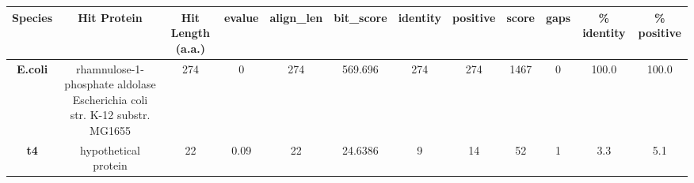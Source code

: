 \begin{tabular}{|c|c|c|c|c|c|c|c|c|c|c|c|} \hline
\textbf{Species} & \textbf{Hit Protein} & \textbf{Hit Length (a.a.)} & \textbf{evalue} & \textbf{align\_len} & \textbf{bit\_score} & \textbf{identity} & \textbf{positive} & \textbf{score} & \textbf{gaps} & \textbf{\% identity} & \textbf{\% positive} \\ \hline
\textbf{E.coli} & rhamnulose-1-phosphate aldolase Escherichia coli str. K-12 substr. MG1655 & 274 & 0 & 274 & 569.696 & 274 & 274 & 1467 & 0 & 100.0 & 100.0\\
\textbf{t4} & hypothetical protein  & 22 & 0.09 & 22 & 24.6386 & 9 & 14 & 52 & 1 & 3.3 & 5.1\\
\hline \end{tabular}
